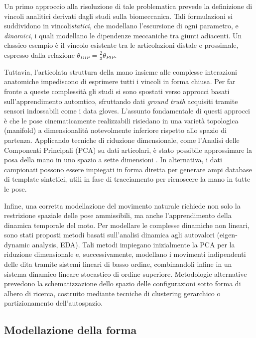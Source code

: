 Un primo approccio alla risoluzione di tale problematica prevede la definizione di vincoli analitici derivati dagli studi sulla biomeccanica.
Tali formulazioni si suddividono in vincoli\emph{statici}, che modellano l'escursione di ogni parametro, e \emph{dinamici}, i quali modellano le dipendenze meccaniche tra giunti adiacenti.
Un classico esempio è il vincolo esistente tra le articolazioni distale e prossimale, espresso dalla relazione $\theta_{DIP} = \frac{2}{3}\theta_{PIP}$.

Tuttavia, l'articolata struttura della mano insieme alle complesse interazioni a\-na\-to\-mi\-che impediscono di esprimere tutti i vincoli in forma chiusa.
Per far fronte a queste complessità gli studi si sono spostati verso approcci basati sull'apprendimento automtico, sfruttando dati \emph{ground truth} acquisiti tramite sensori indossabili come i data gloves.
L'assunto fondamentale di questi approcci è che le pose cinematicamente realizzabili risiedano in una varietà topologica (manifold) a dimensionalità notevolmente inferiore rispetto allo spazio di partenza.
Applicando tecniche di riduzione dimensionale, come l'Analisi delle Componenti Principali (PCA) su dati articolari, è stato possibile approssimare la posa della mano in uno spazio a sette dimensioni \cite{lin2000modeling}.
In alternativa, i dati campionati possono essere impiegati in forma diretta per generare ampi database di template sintetici, utili in fase di tracciamento per ricnoscere la mano in tutte le pose.

Infine, una corretta modellazione del movimento naturale richiede non solo la restrizione spaziale delle pose ammissibili, ma anche l'apprendimento della dinamica temporale del moto. 
Per modellare le complesse dinamiche non lineari, sono stati proposti metodi basati sull'analisi dinamica agli autovalori (eigen-dynamic analysis, EDA).
Tali metodi impiegano inizialmente la PCA per la riduzione dimensionale e, successivamente, modellano i movimenti indipendenti delle dita tramite sistemi lineari di basso ordine, combinandoli infine in un sistema dinamico lineare stocastico di ordine superiore.
Metodologie alternative prevedono la schematizzazione dello spazio delle configurazioni sotto forma di albero di ricerca, costruito mediante tecniche di clustering gerarchico o partizionamento dell'autospazio. 


\subsection{Modellazione della forma}

